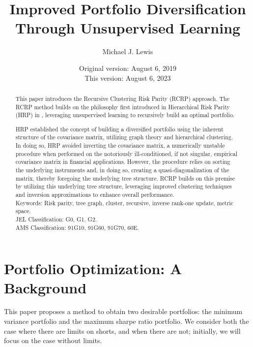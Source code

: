 \documentclass[10pt,twoside,titlepage]{article}   %
\newcommand\blankpage{%
    \null
    \thispagestyle{empty}%
    \addtocounter{page}{-1}%
    \newpage}
\begin{document}
\title{Improved Portfolio Diversification Through Unsupervised Learning}
\author{Michael J. Lewis}
\date{
Original version: August 6, 2019 \\
This version: August 6, 2023 }

\maketitle

\begin{abstract}
This paper introduces the Recursive Clustering Risk Parity (RCRP) approach. 
The RCRP method builds on the philosophy first introduced in Hierarchical Risk Parity (HRP) in \cite{HRP}, leveraging unsupervised learning to recursively build an optimal portfolio. 

HRP established the concept of building a diversified portfolio using the inherent structure of the covariance matrix, utilizing graph theory and hierarchical clustering. In doing so, HRP avoided inverting the covariance matrix, a numerically unstable procedure when performed on the notoriously ill-conditioned, if not singular, empirical covariance matrix in financial applications. However, the procedure relies on sorting the underlying instruments and, in doing so, creating a quasi-diagonalization of the matrix,  thereby foregoing the underlying tree structure. RCRP builds on this premise by utilizing this underlying tree structure, leveraging improved clustering techniques and inversion approximations to enhance overall performance.\\
Keywords: Risk parity, tree graph, cluster, recursive, inverse rank-one update, metric space.\\
JEL Classification: G0, G1, G2.\\
AMS Classification: 91G10, 91G60, 91G70, 60E.\\
\end{abstract}

\section{Portfolio Optimization: A Background}\label{sec-intro}
This paper proposes a method to obtain two desirable portfolios: the minimum variance portfolio and the maximum sharpe ratio portfolio. 
We consider both the case where there are limits on shorts, and when there are not; initially, we will focus on the case without limits.
\end{document}
